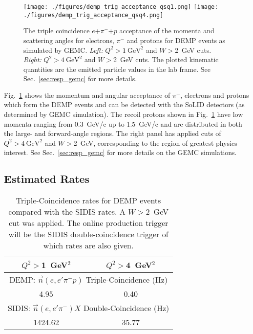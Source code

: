 \begin{figure}[hbt!]
\begin{center}
\texttt{[image: ./figures/demp\_trig\_acceptance\_qsq1.png]}
\texttt{[image: ./figures/demp\_trig\_acceptance\_qsq4.png]}
\end{center}
\caption{\label{fig:p_theta}
\footnotesize{The triple coincidence $e$+$\pi^-$+$p$ acceptance of the momenta
  and scattering angles for electrons, $\pi^{-}$ and protons for DEMP events
  as simulated by GEMC.
{\em Left:} $Q^{2}>1~\mathrm{GeV^{2}}$ and $W>$2~GeV cuts.
{\em Right:} $Q^{2}>4~\mathrm{GeV^{2}}$ and $W>$2~GeV cuts.
The plotted kinematic quantities are the emitted particle values in the lab
frame.  See Sec.~\ref{sec:resp_gemc} for more details.
}}
\end{figure}

Fig.~\ref{fig:p_theta} shows the momentum and angular acceptance of $\pi^{-}$,
electrons and protons which form the DEMP events and can be detected with the
SoLID detectors (as determined by GEMC simulation).  The recoil protons shown
in Fig.~\ref{fig:p_theta} have low momenta ranging from 0.3~GeV/c up to
1.5~GeV/c and are distributed in both the large- and forward-angle regions.
The right panel has applied cuts of $Q^{2}>4~\mathrm{GeV^{2}}$ and $W>$2~GeV,
corresponding to the region of greatest physics interest.  See
Sec.~\ref{sec:resp_gemc} for more details on the GEMC simulations.

\subsection{Estimated Rates
\label{sec:rates}}

\begin{table}[!ht]
\centering
\begin{tabular}{|c|c|}
 \hline
  $Q^2>$1~GeV$^2$ & $Q^2>$4~GeV$^2$\\
 \hline
\multicolumn{2}{|c|}{DEMP: $\vec{n}(e,e'\pi^{-}p)$ Triple-Coincidence (Hz)}\\
 \hline
 4.95   &  0.40 \\
 \hline
\multicolumn{2}{|c|}{SIDIS: $\vec{n}(e,e'\pi^{-})X$ Double-Coincidence (Hz)}\\
 \hline
   1424.62  & 35.77   \\
 \hline
\end{tabular}
\caption[Triple-Coincidence rates for
  neutron-DEMP]{\footnotesize{Triple-Coincidence rates for DEMP events compared
    with the SIDIS rates. A $W>$2~GeV cut was applied. The online production
    trigger will be the SIDIS double-coincidence trigger of which rates are
    also given.}}
\label{rate_table}
\end{table} 

